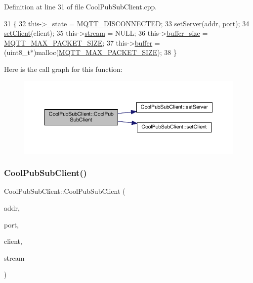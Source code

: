 Definition at line 31 of file Cool\+Pub\+Sub\+Client.\+cpp.


\begin{DoxyCode}
31                                                                                 \{
32     this->\hyperlink{class_cool_pub_sub_client_aa1953b601206252a30efa5b114eb3e1a}{\_state} = \hyperlink{_cool_pub_sub_client_8h_adaf86a906a305dd129164982d50111b3}{MQTT\_DISCONNECTED};
33     \hyperlink{class_cool_pub_sub_client_a947e70c394c66c7d08d0c53caf8425e3}{setServer}(addr, \hyperlink{class_cool_pub_sub_client_a01e3249102c057756af7a515c179844e}{port});
34     \hyperlink{class_cool_pub_sub_client_a7ee119b786010561ab6a9afa0798e91d}{setClient}(client);
35     this->\hyperlink{class_cool_pub_sub_client_a7a92417b317e7bd9502ed37752111705}{stream} = NULL;
36     this->\hyperlink{class_cool_pub_sub_client_ae6cb10e42c057483d53516ac830ab526}{buffer\_size} = \hyperlink{_cool_pub_sub_client_8h_ae09b594688a59f1427c7e45259e039b9}{MQTT\_MAX\_PACKET\_SIZE};
37     this->\hyperlink{class_cool_pub_sub_client_a7e8bcc6096626916046a51bebadc7851}{buffer} = (uint8\_t*)malloc(\hyperlink{_cool_pub_sub_client_8h_ae09b594688a59f1427c7e45259e039b9}{MQTT\_MAX\_PACKET\_SIZE});
38 \}
\end{DoxyCode}
Here is the call graph for this function\+:\nopagebreak
\begin{figure}[H]
\begin{center}
\leavevmode
\includegraphics[width=350pt]{d8/d4b/class_cool_pub_sub_client_a4548ad6f306f6181e337a86c0b21a89a_cgraph}
\end{center}
\end{figure}
\mbox{\label{class_cool_pub_sub_client_af8b1aeb169366da52e3289bb6c238b6b}} 
\subsubsection{\texorpdfstring{Cool\+Pub\+Sub\+Client()}{CoolPubSubClient()}\hspace{0.1cm}{\footnotesize\ttfamily [4/14]}}
{\footnotesize\ttfamily Cool\+Pub\+Sub\+Client\+::\+Cool\+Pub\+Sub\+Client (\begin{DoxyParamCaption}\item[{I\+P\+Address}]{addr,  }\item[{uint16\+\_\+t}]{port,  }\item[{Client \&}]{client,  }\item[{Stream \&}]{stream }\end{DoxyParamCaption})}



